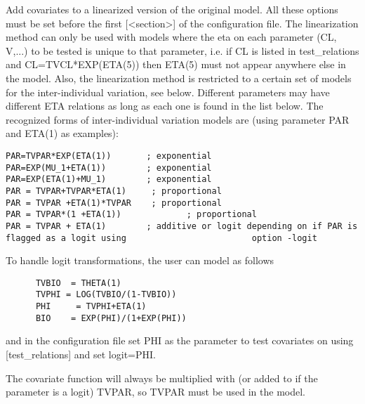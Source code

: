 \documentclass[a4paper,12pt]{article}
\begin{document}
Add covariates to a linearized version of the  original model. All these options must be set before the first [<section>] of the configuration file. The linearization method can only be used with models where the eta on each parameter (CL, V,...) to be tested is unique to that parameter, i.e. if  CL is listed in test\_relations and CL=TVCL*EXP(ETA(5)) then ETA(5) must not appear anywhere else in the model. Also, the linearization method is restricted to a certain set of models for the inter-individual variation, see below. Different parameters may have different ETA relations as long as each one is found in the list below.
The recognized forms of inter-individual variation models are (using parameter PAR and ETA(1) as  examples):
\begin{verbatim}
PAR=TVPAR*EXP(ETA(1))	   	; exponential
PAR=EXP(MU_1+ETA(1))     	; exponential
PAR=EXP(ETA(1)+MU_1)    	; exponential
PAR = TVPAR+TVPAR*ETA(1)     ; proportional
PAR = TVPAR +ETA(1)*TVPAR    ; proportional
PAR = TVPAR*(1 +ETA(1))          	; proportional
PAR = TVPAR + ETA(1)   	 	; additive or logit depending on if PAR is flagged as a logit using 						option -logit
\end{verbatim}
To handle logit transformations, the user can model as follows
\begin{verbatim}
      TVBIO  = THETA(1)
      TVPHI = LOG(TVBIO/(1-TVBIO))
      PHI     = TVPHI+ETA(1)	
      BIO    = EXP(PHI)/(1+EXP(PHI))
\end{verbatim}
and in the configuration file set PHI as the parameter to test covariates on using [test\_relations] and set logit=PHI.

The covariate function will always be multiplied with (or added to if the parameter is a logit) TVPAR, so TVPAR must be used in the model.
\end{document}

